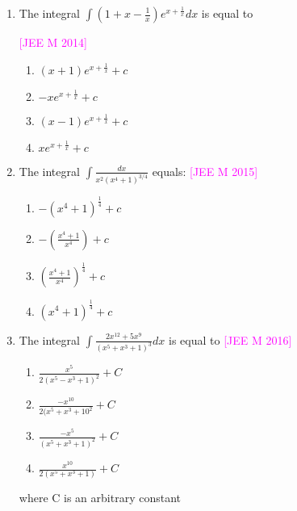 \documentclass[journal,12pt,twocolumn]{IEEEtran}
\theoremstyle{remark}
\begin{document}
\begin{enumerate}[label=\textcolor{magenta}{\arabic*.}]
		(d) $\frac{1}{3}[x^3\psi(x^3)-\int x^3\psi(x^3)dx] + C$

	\item The integral $\int(1+x-\frac{1}{x})e^{x+\frac{1}{x}}dx$ is equal to

		\hfill{\textcolor{magenta}{[JEE M 2014]}}

		\begin{multicols}{2}
			\begin{enumerate}[label=(\alph*)]
				\item $(x+1)e^{x+\frac{1}{x}}+c$
				\item $-xe^{x+\frac{1}{x}}+c$
				\item $(x-1)e^{x+\frac{1}{x}}+c$
				\item $xe^{x+\frac{1}{x}}+c$
			\end{enumerate}
		\end{multicols}

	\item The integral $\int\frac{dx}{x^2(x^4+1)^{3/4}}$ equals:
		\hfill{\textcolor{magenta}{[JEE M 2015]}}

		\begin{multicols}{2}
			\begin{enumerate}[label=(\alph*)]
				\item $-(x^4+1)^{\frac{1}{4}}+c$
				\item $-(\frac{x^4+1}{x^4})+c$
				\item $(\frac{x^4+1}{x^4})^{\frac{1}{4}}+c$
				\item $(x^4+1)^{\frac{1}{4}}+c$
			\end{enumerate}
		\end{multicols}

	\item The integral $\int\frac{2x^{12}+5x^9}{(x^5+x^3+1)^3}dx$ is equal to
		\hfill{\textcolor{magenta}{[JEE M 2016]}}

		\begin{multicols}{2}
			\begin{enumerate}[label=(\alph*)]
				\item $\frac{x^5}{2(x^5-x^3+1)^2}+C$
				\item $\frac{-x^{10}}{2(x^5+x^3+10^2}+C$
				\item $\frac{-x^5}{(x^5+x^3+1)^2}+C$
				\item $\frac{x^{10}}{2(x^5+x^3+1)}+C$
			\end{enumerate}
		\end{multicols}
		where C is an arbitrary constant


\end{enumerate}
\end{document}
